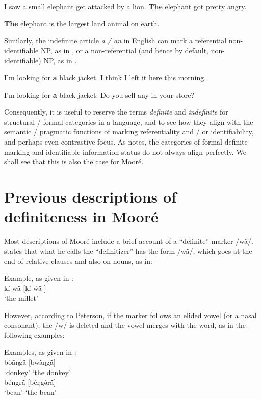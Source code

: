 \documentclass[output=paper]{langsci/langscibook}
\begin{document}
\ea\label{ex:teo:6}
I saw a small elephant get attacked by a lion. \textbf{The} elephant got pretty angry.
\z

\ea\label{ex:teo:7}
\textbf{The} elephant is the largest land animal on earth.
\z

Similarly, the indefinite article \textit{a / an} in English can mark a referential non-identifiable NP, as in , or a non-referential (and hence by default, non-identifiable) NP, as in .

\ea\label{ex:teo:8}
I’m looking for \textbf{a} black jacket. I think I left it here this morning. 
\z

\ea\label{ex:teo:9}
I’m looking for \textbf{a} black jacket. Do you sell any in your store? 
\z

Consequently, it is useful to reserve the terms \textit{definite} and \textit{indefinite} for structural / formal categories in a language, and to see how they align with the semantic / pragmatic functions of marking referentiality and / or identifiability, and perhaps even contrastive focus. As \citet[79]{Lambrecht1994} notes, the categories of formal definite marking and identifiable information status do not always align perfectly. We shall see that this is also the case for Mooré.

\section{Previous descriptions of definiteness in Mooré}\label{sec:teo:3}

Most descriptions of Mooré include a brief account of a “definite” marker /wã/. \citet[77]{Peterson1971} states that what he calls the “definitizer” has the form /wã/, which goes at the end of relative clauses and also on nouns, as in:

\ea\label{ex:teo:10}
Example, as given in \citet[77]{Peterson1971}:\\
 kí w\'{ã}  [kí \'{w}\'{ã} ]\\
‘the millet’
\z

However, according to Peterson, if the marker follows an elided vowel (or a nasal consonant), the /w/ is deleted and the vowel merges with the word, as in the following examples:

\ea\label{ex:teo:11}
Examples, as given in \citet[77]{Peterson1971}:\\
  {bòãŋg\'{ã}  [bw\`{ã}ŋg\'{ã}]} \\
{‘donkey’}  {‘the donkey’} \\
  {béngr\'{ã}  [béŋg\'{ə}r\'{ã}]} \\
‘bean’  {‘the bean’} \\
\z
\end{document}
